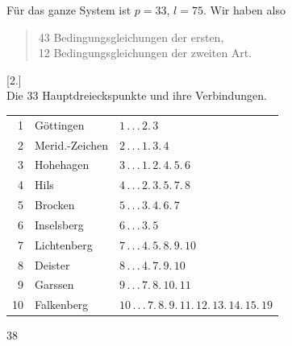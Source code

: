 Für das ganze System ist $p=33$, $l=75$. Wir haben also
\begin{quote}
43 Bedingungsgleichungen der ersten,\\
12 Bedingungsgleichungen der zweiten Art.
\end{quote}
\begin{center}
[2.]\\[3pt]
Die 33 Hauptdreieckspunkte und ihre Verbindungen.
\end{center}
\noindent
\begin{tabular}{r|l|l}
1&Göttingen&$1\,.\,.\,.\,2.\,3$\\
2&Merid.-Zeichen&$2\,.\,.\,.\,1.\,3.\,4$\\
3&Hohehagen&$3\,.\,.\,.\,1.\,2.\,4.\,5.\,6$\\
4&Hils&$4\,.\,.\,.\,2.\,3.\,5.\,7.\,8$\\
5&Brocken&$5\,.\,.\,.\,3.\,4.\,6.\,7$\\
6&Inselsberg&$6\,.\,.\,.\,3.\,5$\\
7&Lichtenberg&$7\,.\,.\,.\,4.\,5.\,8.\,9.\,10$\\
8&Deister&$8\,.\,.\,.\,4.\,7.\,9.\,10$\\
9&Garssen&$9\,.\,.\,.\,7.\,8.\,10.\,11$\\
10&Falkenberg&$10\,.\,.\,.\,7.\,8.\,9.\,11.\,12.\,13.\,14.\,15.\,19$
\end{tabular}
\vfill
{}\hfill38

